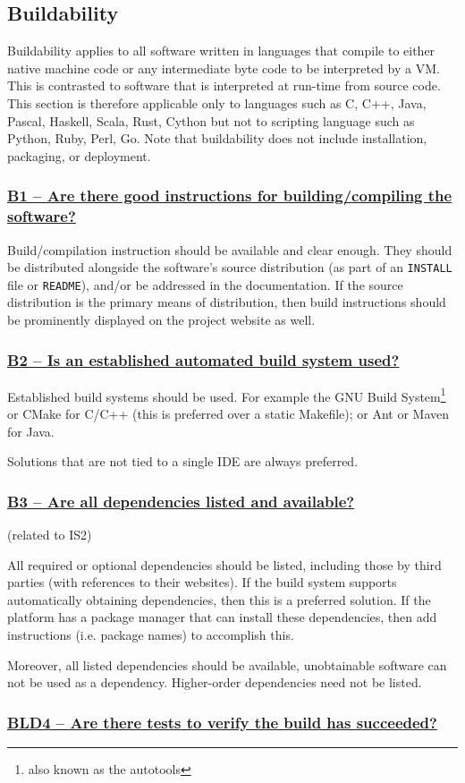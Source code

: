 \documentclass[a4paper,11pt]{article}
\newcommand{\criterion}[1]{\subsubsection*{\underline{#1}}}
\begin{document}
\subsection{Buildability}

Buildability applies to all software written in languages that compile to
either native machine code or any intermediate byte code to be interpreted by a VM.
This is contrasted to software that is interpreted at run-time from source
code. This section is therefore applicable only to languages such as C, C++,
Java, Pascal, Haskell, Scala, Rust, Cython but not to scripting language such
as Python, Ruby, Perl, Go.  Note that buildability does not include
installation, packaging, or deployment.

\criterion{B1 -- Are there good instructions for building/compiling the software?}

Build/compilation instruction should be available and clear enough. They should
be distributed alongside the software's source distribution (as part of an
\texttt{INSTALL} file or \texttt{README}), and/or be addressed in the documentation. If the
source distribution is the primary means of distribution, then build
instructions should be prominently displayed on the project website as well.

\criterion{B2 -- Is an established automated build system used?}

Established build systems should be used. For example the GNU Build
System\footnote{also known as the autotools} or CMake for C/C++ (this is
preferred over a static Makefile); or Ant or Maven for Java. 

Solutions that are not tied to a single IDE are always preferred.

\criterion{B3 -- Are all dependencies listed and available?}
(related to IS2)

All required or optional dependencies should be listed, including those by
third parties (with references to their websites). If the build system supports
automatically obtaining dependencies, then this is a preferred solution. If the
platform has a package manager that can install these dependencies, then add
instructions (i.e. package names) to accomplish this.

Moreover, all listed dependencies should be available, unobtainable software
can not be used as a dependency. Higher-order dependencies need not be listed.

\criterion{BLD4 -- Are there tests to verify the build has succeeded?}
\end{document}
